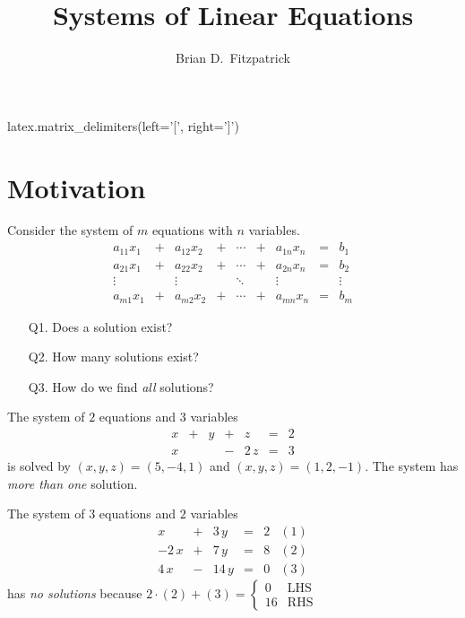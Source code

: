 \documentclass[12pt]{article}
\begin{document}
\title{Systems of Linear Equations}
\author{Brian D.\ Fitzpatrick}
\date{\cite[\S1.1]{peterson}}

\maketitle


\begin{sagesilent}
  latex.matrix_delimiters(left='[', right=']')
\end{sagesilent}

\section{Motivation}

Consider the system of $m$ equations with $n$ variables.
\begin{equation}\label{eq:motivation}
  \begin{array}{rcrcccrcr}
    a_{11}x_1 & + & a_{12}x_2 & + & \dotsb & + & a_{1n}x_n & = & b_1    \\
    a_{21}x_1 & + & a_{22}x_2 & + & \dotsb & + & a_{2n}x_n & = & b_2    \\
    \vdots    &   & \vdots    &   & \ddots &   & \vdots    &   & \vdots \\
    a_{m1}x_1 & + & a_{m2}x_2 & + & \dotsb & + & a_{mn}x_n & = & b_m
  \end{array}\tag{$\ast$}
\end{equation}
\begin{itemize}
\item[Q1.] Does a solution exist?
\item[Q2.] How many solutions exist?
\item[Q3.] How do we find \emph{all} solutions?
\end{itemize}

\begin{ex}
  The system of $2$ equations and $3$ variables
  \[
  \begin{array}{rcrcrcr}
    x & + & y & + & z    & = & 2  \\
    x &   &   & - & 2\,z & = & 3
  \end{array}
  \]
  is solved by $(x,y,z)=(5,-4,1)$ and $(x,y,z)=(1,2,-1)$. The system has
  \emph{more than one} solution.
\end{ex}

\begin{ex}
  The system of $3$ equations and $2$ variables
  \[
  \begin{array}{rcrcrr}
    x     & + & 3\,y  & = & 2 & (1)\\
    -2\,x & + & 7\,y  & = & 8 & (2)\\
    4\,x  & - & 14\,y & = & 0 & (3)
  \end{array}
  \]
  has \emph{no solutions} because
  $
  2\cdot(2)+(3)
  =
  \begin{cases}
    0 & \text{LHS} \\
    16 & \text{RHS}
  \end{cases}
  $
\end{ex}
\end{document}
